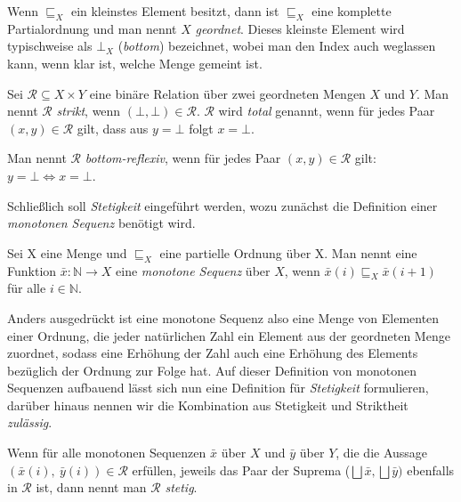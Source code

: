 \begin{mydef}
Wenn $\sqsubseteq_{X}$ ein kleinstes Element besitzt, dann ist $\sqsubseteq_{X}$ eine komplette Partialordnung und man nennt $X$
\textit{geordnet}. Dieses kleinste Element wird typischweise als $\bot_{X}$ (\textit{bottom}) bezeichnet, wobei man den Index
auch weglassen kann, wenn klar ist, welche Menge gemeint ist.
\end{mydef}

\begin{mydef}
Sei $\mathcal{R} \subseteq X \times Y$ eine binäre Relation über zwei geordneten Mengen $X$ und $Y$. Man nennt $\mathcal{R}$ \textit{strikt},
wenn $(\bot, \bot) \in \mathcal{R}$. $\mathcal{R}$ wird \textit{total} genannt, wenn für jedes Paar $(x, y) \in \mathcal{R}$ gilt, dass
aus $y = \bot$ folgt $x = \bot$.
\end{mydef}

\begin{mydef}
Man nennt $\mathcal{R}$ \textit{bottom-reflexiv}, wenn für jedes Paar
$(x, y) \in \mathcal{R}$ gilt: $y = \bot \Leftrightarrow x = \bot$.
\end{mydef}

Schließlich soll \textit{Stetigkeit} eingeführt werden, wozu zunächst die Definition einer \textit{monotonen Sequenz} benötigt wird.

\begin{mydef}
Sei X eine Menge und $\sqsubseteq_{X}$ eine partielle Ordnung über X. Man nennt eine Funktion $\bar{x} : \mathbb{N} \rightarrow X$
eine \textit{monotone Sequenz} über $X$, wenn $\bar{x}(i) \sqsubseteq_{X} \bar{x}(i + 1)$ für alle $i \in \mathbb{N}$.
\end{mydef}

Anders ausgedrückt ist eine monotone Sequenz also eine Menge von Elementen einer Ordnung,
die jeder natürlichen Zahl ein Element aus der geordneten Menge
zuordnet, sodass eine Erhöhung der Zahl auch eine Erhöhung des Elements bezüglich der Ordnung zur Folge hat.
Auf dieser Definition von monotonen Sequenzen aufbauend lässt sich nun eine Definition für \textit{Stetigkeit} formulieren, darüber
hinaus nennen wir die Kombination aus Stetigkeit und Striktheit \textit{zulässig}.

\begin{mydef}
Wenn für alle monotonen Sequenzen $\bar{x}$ über $X$ und $\bar{y}$ über $Y$, die die Aussage $(\bar{x}(i),~\bar{y}(i)) \in\mathcal{R}$
erfüllen, jeweils das Paar der Suprema ($\bigsqcup{\bar{x}}, \bigsqcup{\bar{y}})$ ebenfalls in $\mathcal{R}$ ist, dann nennt man $\mathcal{R}$ \textit{stetig}.
\end{mydef}

